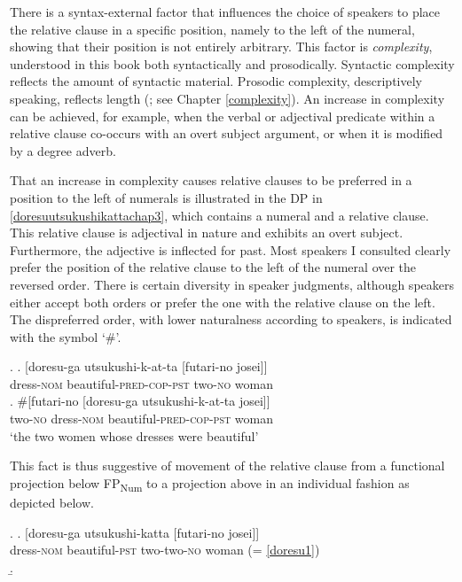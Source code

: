 \documentclass [output=book,colorlinks,citecolor=brown]{langscibook}
\begin{document}
There is a syntax-external factor that influences the choice of speakers to place the relative clause in a specific position, namely to the left of the numeral, showing that their position is not entirely arbitrary. This factor is \textit{complexity}, understood in this book both syntactically and prosodically. Syntactic complexity reflects the amount of syntactic material. Prosodic complexity, descriptively speaking, reflects length (\citealt{hawkins:2007:efficiency}; see Chapter \ref{complexity}). An increase in complexity can be achieved, for example, when the verbal or adjectival predicate within a relative clause co-occurs with an overt subject argument, or when it is modified by a degree adverb. %

That an increase in complexity causes relative clauses to be preferred in a position to the left of numerals is illustrated in the DP in \ref{doresuutsukushikattachap3}, which contains a numeral and a relative clause. This relative clause is adjectival in nature and exhibits an overt subject. Furthermore, the adjective is inflected for past. Most speakers I consulted clearly prefer the position of the relative clause to the left of the numeral over the reversed order. There is certain diversity in speaker judgments, although speakers either accept both orders or prefer the one with the relative clause on the left. The dispreferred order, with lower naturalness according to speakers, is indicated with the symbol `\#’.

\ex. \label{doresuutsukushikattachap3} \ag. [doresu-ga utsukushi-k-at-ta [futari-no josei]]\\
dress-\textsc{nom} beautiful-\textsc{pred-cop-pst} two-\textsc{no} woman \label{doresu1}\\
\bg. \#[futari-no [doresu-ga utsukushi-k-at-ta josei]]\\
two-\textsc{no} dress-\textsc{nom} beautiful-\textsc{pred-cop-pst} woman\\
`the two women whose dresses were beautiful'

This fact is thus suggestive of movement of the relative clause from a functional projection below FP\textsubscript{Num} to a projection above in an individual fashion as depicted below.


\ex. \ag. [doresu-ga utsukushi-katta [futari-no josei]]\\
dress-\textsc{nom} beautiful-\textsc{pst} two-two-\textsc{no} woman (= \ref{doresu1})\\
\b. \hspace{-2cm} 
\end{document}
